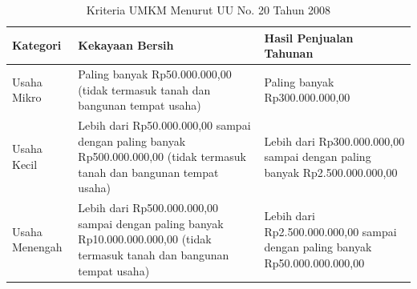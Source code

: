 \begin{table}[H]
    \centering
    \begin{tabular}{|l|p{5cm}|p{5cm}|}
        \hline
        \textbf{Kategori} & \textbf{Kekayaan Bersih} & \textbf{Hasil Penjualan Tahunan} \\
        \hline
        Usaha Mikro & 
        Paling banyak Rp50.000.000,00 (tidak termasuk tanah dan bangunan tempat usaha) &
        Paling banyak Rp300.000.000,00 \\
        \hline
        Usaha Kecil &
        Lebih dari Rp50.000.000,00 sampai dengan paling banyak Rp500.000.000,00 (tidak termasuk tanah dan bangunan tempat usaha) &
        Lebih dari Rp300.000.000,00 sampai dengan paling banyak Rp2.500.000.000,00 \\
        \hline
        Usaha Menengah &
        Lebih dari Rp500.000.000,00 sampai dengan paling banyak Rp10.000.000.000,00 (tidak termasuk tanah dan bangunan tempat usaha) &
        Lebih dari Rp2.500.000.000,00 sampai dengan paling banyak Rp50.000.000.000,00 \\
        \hline
    \end{tabular}
    \caption{Kriteria UMKM Menurut UU No. 20 Tahun 2008 \cite{uuumkm2008}}
    \label{tab:kriteria-umkm}
\end{table}
